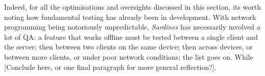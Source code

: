 \documentclass[a4paper, 9pt]{article}
\begin{document}
\begin{flushleft}
\vspace{5pt}\noindent
Indeed, for all the optimisations and oversights discussed in this section, its worth noting how fundamental testing has already been in development. With network programming being notoriously unpredictable, \textit{Sardines} has necessarily involved a lot of QA: a feature that works offline must be tested between a single client and the server; then between two clients on the same device; then across devices, or between more clients, or under poor network conditions; the list goes on. While [Conclude here, or one final paragraph for more general reflection?].



\end{flushleft}
\end{document}
